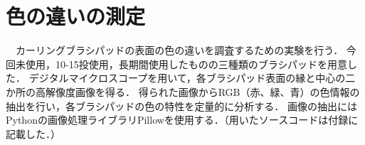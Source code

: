 \documentclass[main]{subfiles}
\begin{document}
\section{色の違いの測定}
　カーリングブラシパッドの表面の色の違いを調査するための実験を行う．
今回未使用，10-15投使用，長期間使用したものの三種類のブラシパッドを用意した．
デジタルマイクロスコープを用いて，各ブラシパッド表面の縁と中心の二か所の高解像度画像を得る．
得られた画像からRGB（赤、緑、青）の色情報の抽出を行い，各ブラシパッドの色の特性を定量的に分析する．
画像の抽出にはPythonの画像処理ライブラリPillowを使用する．（用いたソースコードは付録に記載した．）
\end{document}
